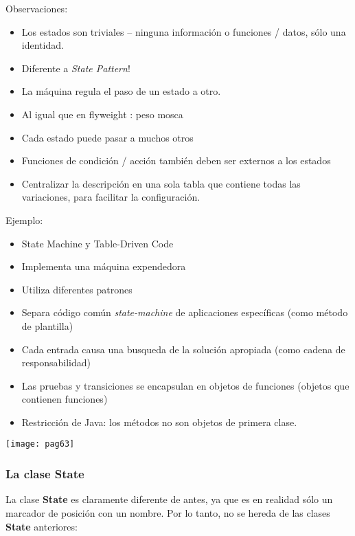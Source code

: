 Observaciones:

\begin{itemize}
    \item Los estados son triviales – ninguna información o funciones / datos, sólo una identidad.
    \item Diferente a \textit{State Pattern}!
    \item La máquina regula el paso de un estado a otro.
    \item Al igual que en flyweight : peso mosca
    \item Cada estado puede pasar a muchos otros
    \item Funciones de condición / acción también deben ser externos a los estados
    \item Centralizar la descripción en una sola tabla que contiene todas las variaciones, para facilitar la configuración.
\end{itemize}

Ejemplo:

\begin{itemize}
    \item State Machine y Table-Driven Code 
    \item Implementa una máquina expendedora
    \item Utiliza diferentes patrones
    \item Separa código común \textit{state-machine} de aplicaciones específicas (como método de plantilla)
    \item Cada entrada causa una busqueda de la solución apropiada (como cadena de responsabilidad)
    \item Las pruebas y transiciones se encapsulan en objetos de funciones (objetos que contienen funciones)
    \item Restricción de Java: los métodos no son objetos de primera clase.
\end{itemize}

\texttt{[image: pag63]}  

\subsubsection*{La clase State}
\label{subsubsec:lcs}

 La clase \textbf{State} es claramente diferente de antes, ya que es en realidad sólo un marcador de posición con un nombre. Por lo tanto, no se hereda de las clases \textbf{State} anteriores:    \newline
 
